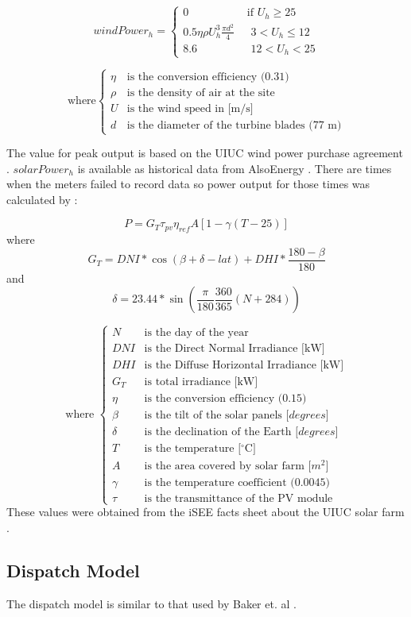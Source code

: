 \begin{equation}
	windPower_h = \begin{cases}
		0 &\text{ if $U_h \geq 25$}\\
		0.5\eta\rho U_h^3\frac{\pi d^2}{4} &\text{ $3 < U_h \leq 12$}\\
		8.6 &\text{ $12 < U_h < 25$}
	\end{cases}
\end{equation}

\begin{equation*}
	\text{where} \begin{cases}
			\eta &\text{is the conversion efficiency (0.31)}\\
	\rho &\text{is the density of air at the site}\\
	U &\text{is the wind speed in [m/s]}\\
	d &\text{is the diameter of the turbine blades (77 m)}
	\end{cases}
\end{equation*}

The value for peak output is based on the UIUC wind power purchase agreement \cite{breitweiser_wind_2016}. $solarPower_h$ is available as historical data from AlsoEnergy \cite{alsoenergy_university_2019}. There are times when the meters failed to record data so power output for those times was calculated by \cite{garcia_nuclear_2015}:

\begin{equation}
 	P = G_T\tau_{pv}\eta_{ref}A[1-\gamma(T-25)]
\end{equation} 
where 
\begin{equation}
	G_T = DNI*\cos(\beta+\delta-lat)+DHI*\frac{180-\beta}{180}
\end{equation}
and
\begin{equation}
	\delta = 23.44*\sin(\frac{\pi}{180}\frac{360}{365}(N+284))
\end{equation}

\begin{equation*}
	\text{where } \begin{cases}
	N &\text{is the day of the year}\\
	DNI &\text{is the Direct Normal Irradiance [kW]}\\
	DHI &\text{is the Diffuse Horizontal Irradiance [kW]}\\
	G_T &\text{is total irradiance [kW]}\\
	\eta &\text{is the conversion efficiency (0.15)}\\
	\beta &\text{is the tilt of the solar panels [$degrees$]}\\
	\delta &\text{is the declination of the Earth [$degrees$]}\\
	T &\text{is the temperature [$^\circ$C]}\\
	A &\text{is the area covered by solar farm [$m^2$]} \\
	\gamma &\text{is the temperature coefficient (0.0045)}\\
	\tau &\text{is the transmittance of the PV module}
	\end{cases}
\end{equation*}
These values were obtained from the iSEE facts sheet about the UIUC solar farm \cite{white_solar_2017}. 

\subsection{Dispatch Model}

The dispatch model is similar to that used by Baker et. al \cite{baker_optimal_2018}.